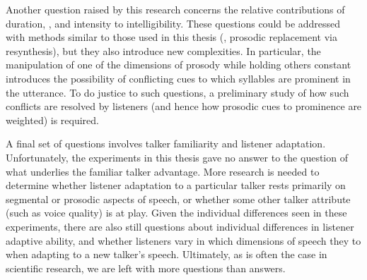 Another question raised by this research concerns the relative contributions of duration, \fo, and intensity to intelligibility.  These questions could be addressed with methods similar to those used in this thesis (\ie, prosodic replacement via resynthesis), but they also introduce new complexities.  In particular, the manipulation of one of the dimensions of prosody while holding others constant introduces the possibility of conflicting cues to which syllables are prominent in the utterance.  To do justice to such questions, a preliminary study of how such conflicts are resolved by listeners (and hence how prosodic cues to prominence are weighted) is required.

A final set of questions involves talker familiarity and listener adaptation.  Unfortunately, the experiments in this thesis gave no answer to the question of what underlies the familiar talker advantage.  More research is needed to determine whether listener adaptation to a particular talker rests primarily on segmental or prosodic aspects of speech, or whether some other talker attribute (such as voice quality) is at play.  Given the individual differences seen in these experiments, there are also still questions about individual differences in listener adaptive ability, and whether listeners vary in which dimensions of speech they  to when adapting to a new talker’s speech.  Ultimately, as is often the case in scientific research, we are left with more questions than answers.


